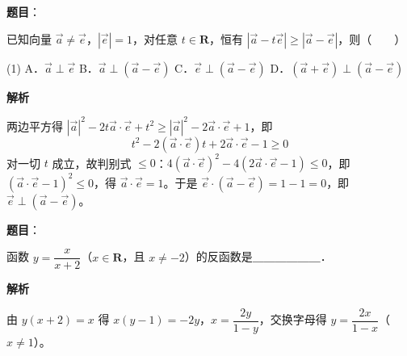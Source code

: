 \begin{answer}

\textbf{题目}：

已知向量 $\vec{a} \neq \vec{e}$，$|\vec{e}| = 1$，对任意 $t \in \mathbf{R}$，恒有 $|\vec{a} - t\vec{e}| \geqslant |\vec{a} - \vec{e}|$，则\mbox{（　　）}

\begin{gkopts}(1)
\task A．$\vec{a} \perp \vec{e}$
\task B．$\vec{a} \perp (\vec{a} - \vec{e})$
\task C．$\vec{e} \perp (\vec{a} - \vec{e})$
\task D．$(\vec{a} + \vec{e}) \perp (\vec{a} - \vec{e})$
\end{gkopts}

\textbf{解析}

两边平方得 $|\vec{a}|^2 - 2t\vec{a}\cdot\vec{e} + t^2 \geqslant |\vec{a}|^2 - 2\vec{a}\cdot\vec{e} + 1$，即
\nopagebreak[4]
\[
t^2 - 2(\vec{a}\cdot\vec{e})t + 2\vec{a}\cdot\vec{e} - 1 \geqslant 0
\]
对一切 $t$ 成立，故判别式 $\leqslant 0$：$4(\vec{a}\cdot\vec{e})^2 - 4(2\vec{a}\cdot\vec{e} - 1) \leqslant 0$，即 $(\vec{a}\cdot\vec{e} - 1)^2 \leqslant 0$，得 $\vec{a}\cdot\vec{e} = 1$。于是 $\vec{e}\cdot(\vec{a} - \vec{e}) = 1 - 1 = 0$，即 $\vec{e} \perp (\vec{a} - \vec{e})$。


\end{answer}
\begin{answer}

\textbf{题目}：

函数 $y = \dfrac{x}{x + 2}$（$x \in \mathbf{R}$，且 $x \neq -2$）的反函数是＿＿＿＿＿＿．

\textbf{解析}

由 $y(x + 2) = x$ 得 $x(y - 1) = -2y$，$x = \dfrac{2y}{1 - y}$，交换字母得 $y = \dfrac{2x}{1 - x}$（$x \neq 1$）。


\end{answer}
